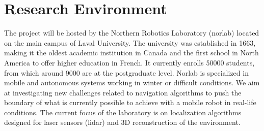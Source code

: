 \documentclass[10pt,letterpaper,oneside]{article}
\begin{document}
\section*{Research Environment}

The project will be hosted by the Northern Robotics Laboratory (norlab) located on the main campus of Laval University.
The university was established in \num{1663}, making it the oldest academic institution in Canada and the first school in North America to offer higher education in French.
It currently enrolls \num{50000} students, from which around \num{9000} are at the postgraduate level.
Norlab is specialized in mobile and autonomous systems working in winter or difficult conditions. 
We aim at investigating new challenges related to navigation algorithms to push the boundary of what is currently possible to achieve with a mobile robot in real-life conditions. 
The current focus of the laboratory is on localization algorithms designed for laser sensors (lidar) and 3D reconstruction of the environment.

\printbibliography
\end{document}
